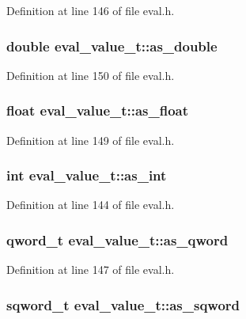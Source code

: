 Definition at line 146 of file eval.h.
\subsubsection[{as\_\-double}]{\setlength{\rightskip}{0pt plus 5cm}double {\bf eval\_\-value\_\-t::as\_\-double}}\label{structeval__value__t_3976d01b4ad3f4e9ac14740966c3c772}




Definition at line 150 of file eval.h.
\subsubsection[{as\_\-float}]{\setlength{\rightskip}{0pt plus 5cm}float {\bf eval\_\-value\_\-t::as\_\-float}}\label{structeval__value__t_5288e871b9db0582d24b85055043d41a}




Definition at line 149 of file eval.h.
\subsubsection[{as\_\-int}]{\setlength{\rightskip}{0pt plus 5cm}int {\bf eval\_\-value\_\-t::as\_\-int}}\label{structeval__value__t_1c7b0c53f652347b7b2cdacdba9b6875}




Definition at line 144 of file eval.h.
\subsubsection[{as\_\-qword}]{\setlength{\rightskip}{0pt plus 5cm}qword\_\-t {\bf eval\_\-value\_\-t::as\_\-qword}}\label{structeval__value__t_9ee8f4216dd3fca95b4b905769e04184}




Definition at line 147 of file eval.h.
\subsubsection[{as\_\-sqword}]{\setlength{\rightskip}{0pt plus 5cm}sqword\_\-t {\bf eval\_\-value\_\-t::as\_\-sqword}}\label{structeval__value__t_42c47da1d93849e5fb84625f5743bb90}




